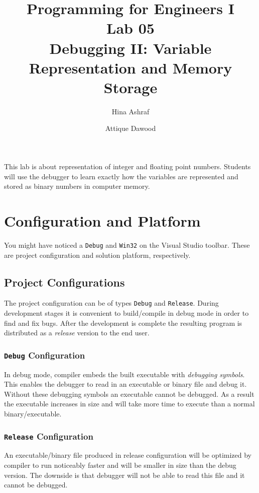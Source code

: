 \documentclass{article}
\title{Programming for Engineers I\\Lab 05\\Debugging II: Variable Representation and Memory Storage}
\author{Hina Ashraf\and Attique Dawood}
\begin{document}
\maketitle

This lab is about representation of integer and floating point numbers. Students will use the debugger to learn exactly how the variables are represented and stored as binary numbers in computer memory\footnotemark.


\section{Configuration and Platform}
You might have noticed a \verb|Debug| and \verb|Win32| on the Visual Studio toolbar. These are project configuration and solution platform, respectively.
\subsection{Project Configurations}
The project configuration can be of types \verb|Debug| and \verb|Release|. During development stages it is convenient to build/compile in debug mode in order to find and fix bugs. After the development is complete the resulting program is distributed as a \emph{release} version to the end user.
\subsubsection{\texttt{Debug} Configuration}
In debug mode, compiler embeds the built executable with \emph{debugging symbols}. This enables the debugger to read in an executable or binary file and debug it. Without these debugging symbols an executable cannot be debugged. As a result the executable increases in size and will take more time to execute than a normal binary/executable.
\subsubsection{\texttt{Release} Configuration}
An executable/binary file produced in release configuration will be optimized by compiler to run noticeably faster and will be smaller in size than the debug version. The downside is that debugger will not be able to read this file and it cannot be debugged.
\end{document}
